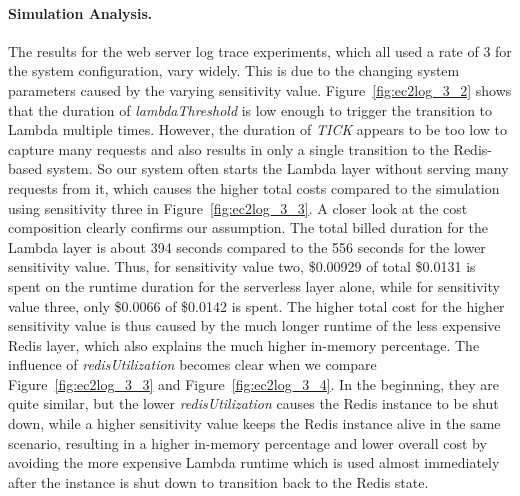 \paragraph{Simulation Analysis.}
The results for the web server log trace experiments, which all used a rate of 3 for the system configuration, vary widely. This is due to the changing system parameters caused by the varying sensitivity value. Figure~\ref{fig:ec2log_3_2} shows that the duration of \emph{lambdaThreshold} is low enough to trigger the transition to Lambda multiple times. However, the duration of \emph{TICK} appears to be too low to capture many requests and also results in only a single transition to the Redis-based system. So our system often starts the Lambda layer without serving many requests from it, which causes the higher total costs compared to the simulation using sensitivity three in Figure~\ref{fig:ec2log_3_3}. A closer look at the cost composition clearly confirms our assumption. The total billed duration for the Lambda layer is about 394 seconds compared to the 556 seconds for the lower sensitivity value. Thus, for sensitivity value two, \$0.00929 of total \$0.0131 is spent on the runtime duration for the serverless layer alone, while for sensitivity value three, only \$0.0066 of \$0.0142 is spent. The higher total cost for the higher sensitivity value is thus caused by the much longer runtime of the less expensive Redis layer, which also explains the much higher in-memory percentage. The influence of \emph{redisUtilization} becomes clear when we compare Figure~\ref{fig:ec2log_3_3} and Figure~\ref{fig:ec2log_3_4}. In the beginning, they are quite similar, but the lower \emph{redisUtilization} causes the Redis instance to be shut down, while a higher sensitivity value keeps the Redis instance alive in the same scenario, resulting in a higher in-memory percentage and lower overall cost by avoiding the more expensive Lambda runtime which is used almost immediately after the instance is shut down to transition back to the Redis state.

